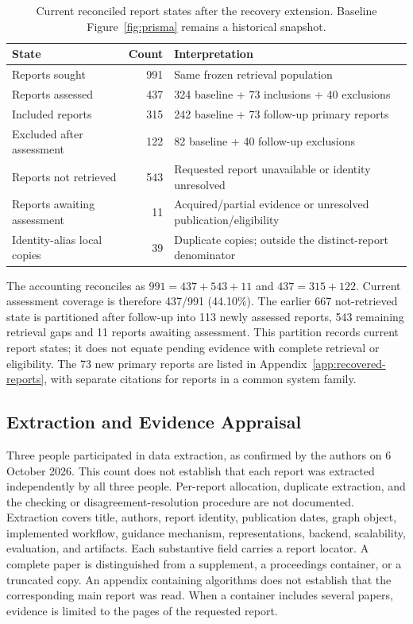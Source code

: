 \documentclass[manuscript,review,screen]{acmart}
\begin{document}
\begin{table}[htbp]
\centering\small
\caption{Current reconciled report states after the recovery extension. Baseline Figure~\ref{fig:prisma} remains a historical snapshot.}
\label{tab:current-flow}
\begin{tabularx}{\linewidth}{Y r Y}
\toprule State & Count & Interpretation\\\midrule
Reports sought & 991 & Same frozen retrieval population\\
Reports assessed & 437 & 324 baseline + 73 inclusions + 40 exclusions\\
Included reports & 315 & 242 baseline + 73 follow-up primary reports\\
Excluded after assessment & 122 & 82 baseline + 40 follow-up exclusions\\
Reports not retrieved & 543 & Requested report unavailable or identity unresolved\\
Reports awaiting assessment & 11 & Acquired/partial evidence or unresolved publication/eligibility\\
Identity-alias local copies & 39 & Duplicate copies; outside the distinct-report denominator\\\bottomrule
\end{tabularx}
\end{table}

The accounting reconciles as $991 = 437 + 543 + 11$ and $437 = 315 + 122$. Current assessment coverage is therefore 437/991 (44.10\%). The earlier 667 not-retrieved state is partitioned after follow-up into 113 newly assessed reports, 543 remaining retrieval gaps and 11 reports awaiting assessment. This partition records current report states; it does not equate pending evidence with complete retrieval or eligibility. The 73 new primary reports are listed in Appendix~\ref{app:recovered-reports}, with separate citations for reports in a common system family.

\subsection{Extraction and Evidence Appraisal}
Three people participated in data extraction, as confirmed by the authors on 6 October 2026. This count does not establish that each report was extracted independently by all three people. Per-report allocation, duplicate extraction, and the checking or disagreement-resolution procedure are not documented. Extraction covers title, authors, report identity, publication dates, graph object, implemented workflow, guidance mechanism, representations, backend, scalability, evaluation, and artifacts. Each substantive field carries a report locator. A complete paper is distinguished from a supplement, a proceedings container, or a truncated copy. An appendix containing algorithms does not establish that the corresponding main report was read. When a container includes several papers, evidence is limited to the pages of the requested report.
\end{document}
